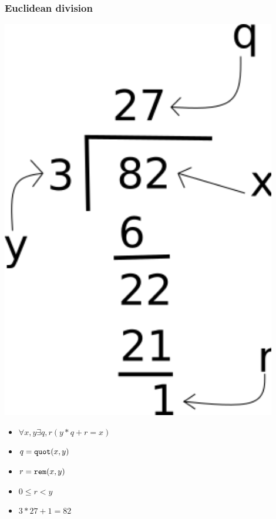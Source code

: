 \documentclass{beamer}
\begin{document}
\begin{frame}[fragile]
\frametitle{Euclidean division}
\begin{minipage}{0.4\textwidth}
\includegraphics[width=0.9\textwidth]{diagrams/euclidean_division.png}\\
\end{minipage}
\begin{minipage}{0.5\textwidth}
\begin{itemize}
\item $\forall x, y \exists q, r (y*q + r = x)$
\item $q = \verb|quot|(x, y)$
\item $r = \verb|rem|(x, y)$
\item $0 \le r < y$
\item $3 * 27 + 1 = 82$
\end{itemize}
\end{minipage}
\end{frame}
\end{document}
